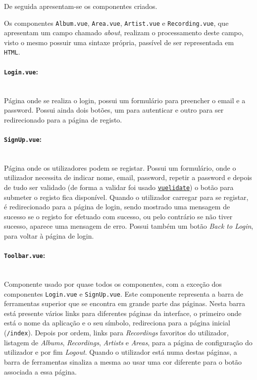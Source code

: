 \documentclass{article}
\begin{document}
\vspace{10px}

De seguida apresentam-se os componentes criados.

Os componentes \texttt{Album.vue}, \texttt{Area.vue}, \texttt{Artist.vue} e \texttt{Recording.vue}, que apresentam um campo chamado \textit{about}, realizam o processamento deste campo, visto o mesmo possuir uma sintaxe própria, passível de ser representada em \texttt{HTML}.~\cite{mbAnnotation}

\paragraph{\texttt{Login.vue}:}\mbox{}\\

Página onde se realiza o login, possui um formulário para preencher o email e a password. Possui ainda dois botões, um para autenticar e outro para ser redirecionado para a página de registo.

\paragraph{\texttt{SignUp.vue}:}\mbox{}\\

Página onde os utilizadores podem se registar. Possui um formulário, onde o utilizador necessita de indicar nome, email, password, repetir a password e depois de tudo ser validado (de forma a validar foi usado \href{https://vuelidate.netlify.com/}{\texttt{vuelidate}}) o botão para submeter o registo fica disponível. Quando o utilizador carregar para se registar, é redirecionado para a página de login, sendo mostrado uma mensagem de sucesso se o registo for efetuado com sucesso, ou pelo contrário se não tiver sucesso, aparece uma mensagem de erro. Possui também um botão \textit{Back to Login}, para voltar à página de login.

\paragraph{\texttt{Toolbar.vue}:}\mbox{}\\

Componente usado por quase todos os componentes, com a exceção dos componentes \texttt{Login.vue} e \texttt{SignUp.vue}. Este componente representa a barra de ferramentas superior que se encontra em grande parte das páginas. Nesta barra está presente vários links para diferentes páginas da interface, o primeiro onde está o nome da aplicação e o seu símbolo, redireciona para a página inicial (\texttt{/index}). Depois por ordem, links para \textit{Recordings} favoritos do utilizador, listagem de \textit{Albums}, \textit{Recordings}, \textit{Artists} e \textit{Areas}, para a página de configuração do utilizador e por fim \textit{Logout}. Quando o utilizador está numa destas páginas, a barra de ferramentas sinaliza a mesma ao usar uma cor diferente para o botão associada a essa página.
\end{document}
